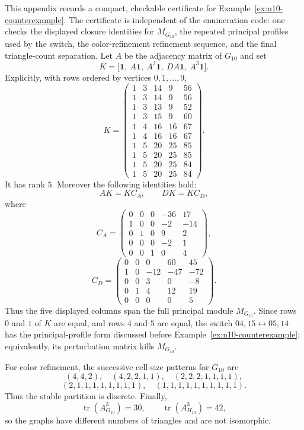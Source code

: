 \documentclass[a4paper,fleqn]{cas-sc}
\theoremstyle{definition}
\theoremstyle{remark}
\newcommand{\one}{\mathbf 1}
\begin{document}
This appendix records a compact, checkable certificate for Example~\ref{ex:n10-counterexample}.  The certificate is independent of the enumeration code: one checks the displayed closure identities for $M_{G_{10}}$, the repeated principal profiles used by the switch, the color-refinement refinement sequence, and the final triangle-count separation.
Let $A$ be the adjacency matrix of $G_{10}$ and set
\[
        K=\bigl[\one,\ A\one,\ A^2\one,\ DA\one,\ A^3\one\bigr].
\]
Explicitly, with rows ordered by vertices $0,
1,
\ldots,
9$,
\[
K=
\begin{pmatrix}
1&3&14&9&56\\
1&3&14&9&56\\
1&3&13&9&52\\
1&3&15&9&60\\
1&4&16&16&67\\
1&4&16&16&67\\
1&5&20&25&85\\
1&5&20&25&85\\
1&5&20&25&84\\
1&5&20&25&84
\end{pmatrix}.
\]
It has rank $5$.  Moreover the following identities hold:
\[
        AK=KC_A,
        \qquad
        DK=KC_D,
\]
where
\[
C_A=
\begin{pmatrix}
0&0&0&-36&17\\
1&0&0&-2&-14\\
0&1&0&9&2\\
0&0&0&-2&1\\
0&0&1&0&4
\end{pmatrix},
\]
\[
C_D=
\begin{pmatrix}
0&0&0&60&45\\
1&0&-12&-47&-72\\
0&0&3&0&-8\\
0&1&4&12&19\\
0&0&0&0&5
\end{pmatrix}.
\]
Thus the five displayed columns span the full principal module $M_{G_{10}}$.
Since rows $0$ and $1$ of $K$ are equal, and rows $4$ and $5$ are equal, the
switch $04,15\leftrightarrow 05,14$ has the principal-profile form discussed before Example~\ref{ex:n10-counterexample}; equivalently, its perturbation matrix kills $M_{G_{10}}$.

For color refinement, the successive cell-size patterns for $G_{10}$ are
\[
(4,4,2),\quad (4,2,2,1,1),\quad (2,2,2,1,1,1,1),
\]
\[
(2,1,1,1,1,1,1,1,1),\quad (1,1,1,1,1,1,1,1,1,1).
\]
Thus the stable partition is discrete.  Finally,
\[
        \operatorname{tr}(A_{G_{10}}^3)=30,
        \qquad
        \operatorname{tr}(A_{H_{10}}^3)=42,
\]
so the graphs have different numbers of triangles and are not isomorphic.
\end{document}

